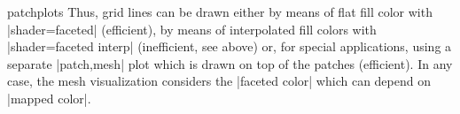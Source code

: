 {\begin{pgfplotslibrary}{patchplots}
	Thus, grid lines can be drawn either by means of flat fill color with |shader=faceted| (efficient), by means of interpolated fill colors with |shader=faceted interp| (inefficient, see above) or, for special applications, using a separate |patch,mesh| plot which is drawn on top of the patches (efficient). In any case, the mesh visualization considers the |faceted color| which can depend on |mapped color|.

\end{pgfplotslibrary}
}
